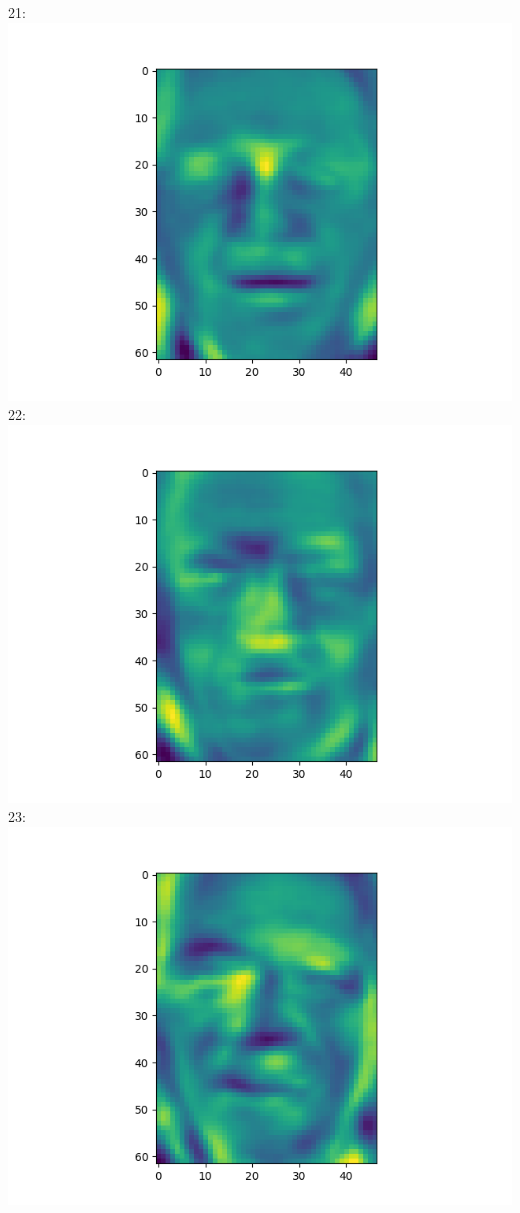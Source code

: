 \documentclass[twoside,10pt]{article}
\theoremstyle{definition}
\theoremstyle{definition}
\theoremstyle{remark}
\renewcommand{\>}{{\rightarrow}}
\newcommand{\1}{{\mathbf 1}}
\newcommand{\0}{{\mathbf 0}}
\begin{document}
\begin{enumerate}
  21:
  \includegraphics[width=\textwidth]{eigenface_21.png}
  22:
  \includegraphics[width=\textwidth]{eigenface_22.png}
  23:
  \includegraphics[width=\textwidth]{eigenface_23.png}

\end{enumerate}
\end{document}
